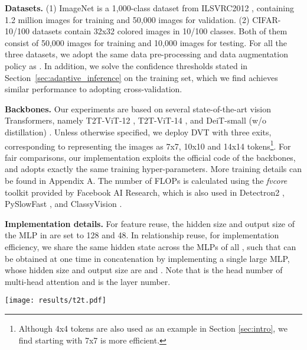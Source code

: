 \documentclass{article}
\begin{document}
\textbf{Datasets.}
(1) ImageNet is a 1,000-class dataset from ILSVRC2012 \cite{5206848}, containing 1.2 million images for training and 50,000 images for validation. 
(2) CIFAR-10/100 datasets \cite{krizhevsky2009learning} contain 32x32 colored images in 10/100 classes. Both of them consist of 50,000 images for training and 10,000 images for testing. For all the three datasets, we adopt the same data pre-processing and data augmentation policy as \cite{He_2016_CVPR, 2016arXiv160806993H, huang2017multi}. In addition, we solve the confidence thresholds stated in Section~\ref{sec:adaptive_inference} on the training set, which we find achieves similar performance to adopting cross-validation. 

\textbf{Backbones.}
Our experiments are based on several state-of-the-art vision Transformers, namely T2T-ViT-12 \cite{yuan2021tokens}, T2T-ViT-14 \cite{yuan2021tokens}, and DeiT-small (w/o distillation) \cite{touvron2020training}. Unless otherwise specified, we deploy DVT with three exits, corresponding to representing the images as 7x7, 10x10 and 14x14 tokens\footnote{Although 4x4 tokens are also used as an example in Section \ref{sec:intro}, we find starting with 7x7 is more efficient.}. For fair comparisons, our implementation exploits the official code of the backbones, and adopts exactly the same training hyper-parameters. More training details can be found in Appendix A. The number of FLOPs is calculated using the \emph{fvcore}  toolkit provided by Facebook AI Research, which is also used in Detectron2 \cite{wu2019detectron2}, PySlowFast \cite{fan2020pyslowfast}, and ClassyVision \cite{adcock2019classy}. 



\textbf{Implementation details.}
For feature reuse, the hidden size and output size of the MLP in  are set to 128 and 48. In relationship reuse, for implementation efficiency, we share the same hidden state across the MLPs of all , such that  can be obtained at one time in concatenation by implementing a single large MLP, whose hidden size and output size are  and . Note that  is the head number of multi-head attention and  is the layer number.

\begin{figure*}[t]
\begin{center}
    \centerline{\texttt{[image: results/t2t.pdf]}}
    \vspace{-1ex}
    \caption{
        Top-1 accuracy v.s. GFLOPs on ImageNet. DVT is implemented on top of T2T-ViT-12/14.
    }
    \label{fig:t2t}
    \end{center}
    \vspace{-4ex}
\end{figure*}
\end{document}
